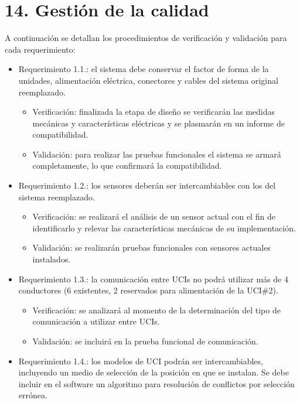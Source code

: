 \documentclass[
11pt, %
codirector, %
]{charter}
\begin{document}
\section{14. Gestión de la calidad}
\label{sec:calidad}
A continuación se detallan los procedimientos de verificación y validación para cada requerimiento: 
\begin{itemize} 
\item Requerimiento 1.1.: el sistema debe conservar el factor de forma de la unidades, alimentación eléctrica, conectores y cables del sistema original reemplazado.
\begin{itemize}
	\item Verificación: finalizada la etapa de diseño se verificarán las medidas mecánicas y características eléctricas y se plasmarán en un informe de compatibilidad. 
	\item Validación: para realizar las pruebas funcionales el sistema se armará completamente, lo que confirmará la compatibilidad. 
\end{itemize}
\item Requerimiento 1.2.: los sensores deberán ser intercambiables con los del sistema reemplazado.
\begin{itemize}
	\item Verificación: se realizará el análisis de un sensor actual con el fin de identificarlo y relevar las características mecánicas de su implementación. 
	\item Validación: se realizarán pruebas funcionales con sensores actuales instalados.
\end{itemize}
\item Requerimiento 1.3.: la comunicación entre UCIs no podrá utilizar más de 4 conductores (6 existentes, 2 reservados para alimentación de la UCI\#2).
\begin{itemize}
	\item Verificación: se analizará al momento de la determinación del tipo de comunicación a utilizar entre UCIs.
	\item Validación: se incluirá en la prueba funcional de comunicación. 
\end{itemize}
\item Requerimiento 1.4.: los modelos de UCI podrán ser intercambiables, incluyendo un medio de selección de la posición en que se instalan. Se debe incluir en el software un algoritmo para resolución de conflictos por selección errónea. 

\end{itemize}
\end{document}
